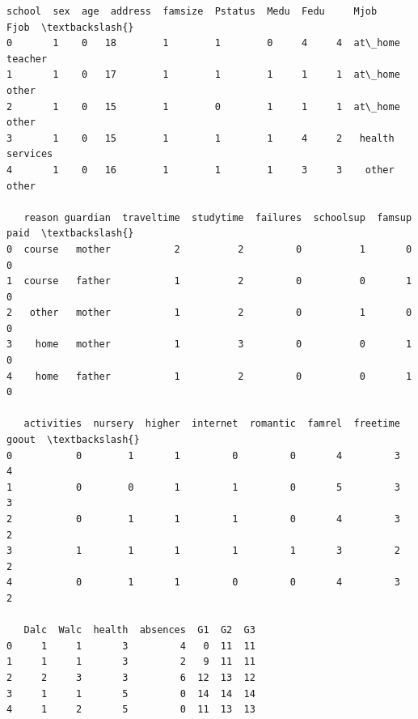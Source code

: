 \documentclass[9pt]{article}
\begin{document}
    
    \begin{Verbatim}[commandchars=\\\{\}]
   school  sex  age  address  famsize  Pstatus  Medu  Fedu     Mjob      Fjob  \textbackslash{}
0       1    0   18        1        1        0     4     4  at\_home   teacher   
1       1    0   17        1        1        1     1     1  at\_home     other   
2       1    0   15        1        0        1     1     1  at\_home     other   
3       1    0   15        1        1        1     4     2   health  services   
4       1    0   16        1        1        1     3     3    other     other   

   reason guardian  traveltime  studytime  failures  schoolsup  famsup  paid  \textbackslash{}
0  course   mother           2          2         0          1       0     0   
1  course   father           1          2         0          0       1     0   
2   other   mother           1          2         0          1       0     0   
3    home   mother           1          3         0          0       1     0   
4    home   father           1          2         0          0       1     0   

   activities  nursery  higher  internet  romantic  famrel  freetime  goout  \textbackslash{}
0           0        1       1         0         0       4         3      4   
1           0        0       1         1         0       5         3      3   
2           0        1       1         1         0       4         3      2   
3           1        1       1         1         1       3         2      2   
4           0        1       1         0         0       4         3      2   

   Dalc  Walc  health  absences  G1  G2  G3  
0     1     1       3         4   0  11  11  
1     1     1       3         2   9  11  11  
2     2     3       3         6  12  13  12  
3     1     1       5         0  14  14  14  
4     1     2       5         0  11  13  13  
    \end{Verbatim}
\end{document}
